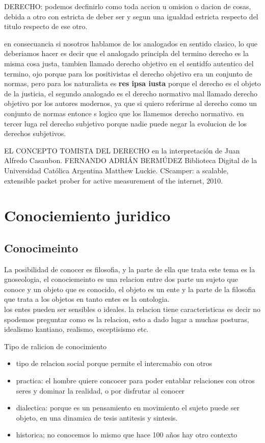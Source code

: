 \documentclass[12pt]{book}
\begin{document}
DERECHO: podemos decfinirlo como toda accion u omision o dacion de cosas, debida a otro con estricta de deber ser y segun una igualdad estricta respecto del titulo respecto de ese otro.

en consecuancia si nosotros hablamos de los analogados en sentido clasico, lo que deberiamos hacer es decir que el analogado principla del termino derecho es la misma cosa justa, tambien llamado derecho objetivo en el sentidfo autentico del termino, ojo porque para los positivistas el derecho objetivo era un conjunto de normas, pero para los naturalista es \textbf{res ipsa iusta }porque el derecho es el objeto de la justicia, el segundo analogado es el derecho normativo mal llamado derecho objetivo por los autores modernos, ya que si quiero referirme al derecho como un conjunto de normas entonce s logico que los llamemos derecho normativo.
en tercer luga rel derecho subjetivo porque nadie puede negar la evolucion de los derechos subjetivos.


\begin{thebibliography}{0}
   EL CONCEPTO TOMISTA DEL DERECHO en la interpretación de Juan Alfredo Casaubon. FERNANDO ADRIÁN BERMÚDEZ
  						Biblioteca Digital de la Universidad Católica Argentina
   Matthew Luckie. CScamper: a scalable, extensible packet 
                              prober for active measurement of the internet, 2010.
\end{thebibliography}


\chapter{Conociemiento juridico}
\section{Conocimeinto}
La posibilidad de conocer es filosofia, y la parte de ella que trata este tema es la gnoseologia, el conociemeinto es una relacion entre dos parte un sujeto que conoce y un objeto que es conocido, el objeto es un ente y la parte de la filosofia que trata a los objetos en tanto entes es la ontologia.
\\
los entes pueden ser sensibles o ideales.
la relacion tiene caracteristicas es decir no spodemos preguntar como es la relacion, esto a dado lugar a muchas posturas, idealismo kantiano, realismo, esceptisismo etc.

Tipo de ralicion de conocimiento
\begin{itemize}
\item tipo de relacion social porque permite el intercmabio con otros
\item practica: el hombre quiere concocer para poder entablar relaciones con otros seres y dominar la realidad, o por disfrutar al conocer
\item dialectica: porque es un pensamiento en movimiento el sujeto puede ser objeto, en una dinamica de tesis antitesis y sintesis.
\item historica; no conocemos lo mismo que hace 100 años hay otro contexto
\end{itemize}
\end{document}
